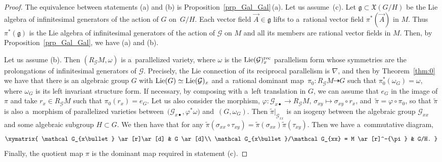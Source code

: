 \documentclass[10pt,a4paper]{amsart}
\numberwithin{equation}{section}
\theoremstyle{definition}
\begin{document}
\begin{proof}
The equivalence between statements (a) and (b) is Proposition~\ref{prp_Gal_Gal}\,(a). Let us assume~(c). Let $\mathfrak g \subset \mathfrak X(G/H)$ be the Lie algebra of infinitesimal generators of the action of $G$ on~$G/H$. Each vector field $\vec A\in \mathfrak g$ lifts to a~rational vector field $\pi^*(\vec A)$ in $M$. Thus $\pi^{*}(\mathfrak g)$ is the Lie algebra of infinitesimal generators of the action of $\mathcal G$ on $M$ and all its members are rational vector fields in $M$. Then, by Proposition~\ref{prp_Gal_Gal}, we have (a) and (b).

Let us assume (b). Then $(R_{\mathcal G}M,\omega)$ is a~parallelized variety, where $\omega$ is the ${\rm Lie}(\mathcal G)_x^{\rm rec}$ parallelism form whose symmetries are the prolongations of infinitesimal generators of $\mathcal G$. Precisely, the Lie connection of its reciprocal parallelism is $\nabla$, and then by Theorem~\ref{thm:0} we have that there is an algebraic group $G$ with ${\rm Lie}(G)\simeq {\rm Lie}(\mathcal G)_x$ and a~rational dominant map~${\pi_0\colon R_\mathcal GM\dasharrow G}$ such that $\pi_0^*(\omega_G) = \omega$, where $\omega_G$ is its left invariant structure form. If necessary, by composing with a~left translation in $G$, we can assume that $e_G$ in the image of $\pi$ and take $r_x\in R_\mathcal GM$ such that $\pi_0(r_x) = e_G$. Let us also consider the morphism,
$\varphi \colon \mathcal G_{x\bullet}\to R_\mathcal GM$, $ \sigma_{xy} \mapsto \sigma_{xy}\circ r_x$,
and~${\widetilde\pi = \varphi\circ \pi_0}$, so that $\widetilde\pi$ is also a~morphism of parallelized varieties between~${\bigl(\mathcal G_{x\bullet },\varphi^*\omega\bigr)}$ and~${(G,\omega_G)}$. Then $\widetilde\pi|_{\mathcal G_{xx}}$ is an isogeny between the algebraic group $\mathcal G_{xx}$ and some algebraic subgroup $H\subset G$. We then have that
for any $\widetilde \pi(\sigma_{xx}\circ \tau_{xy}) = \widetilde\pi(\sigma_{xx}) \widetilde\pi(\tau_{xy})$. Then we have a~commutative diagram,
\[
\xymatrix{
\mathcal G_{x\bullet} \ar[r]\ar[d] & G \ar[d]\\
\mathcal G_{x\bullet}/\mathcal G_{xx} = M \ar[r]^-{\pi} & G/H.
}
\]
Finally, the quotient map $\pi$ is the dominant map required in statement (c).
\end{proof}
\end{document}
